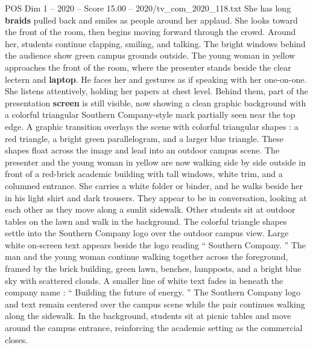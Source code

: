 \begin{textsample}{POS Dim 1 – 2020 – Score 15.00 – 2020/tv\_com\_2020\_118.txt}
She has long \textbf{braids} pulled back and smiles as people around her applaud.
She looks toward the front of the room, then begins moving forward through the crowd.
Around her, students continue clapping, smiling, and talking.
The bright windows behind the audience show green campus grounds outside.
The young woman in yellow approaches the front of the room, where the presenter stands beside the clear lectern and \textbf{laptop}.
He faces her and gestures as if speaking with her one-on-one.
She listens attentively, holding her papers at chest level.
Behind them, part of the presentation \textbf{screen} is still visible, now showing a clean graphic background with a colorful triangular Southern Company-style mark partially seen near the top edge.
A graphic transition overlays the scene with colorful triangular shapes : a red triangle, a bright green parallelogram, and a larger blue triangle.
These shapes float across the image and lead into an outdoor campus scene.
The presenter and the young woman in yellow are now walking side by side outside in front of a red-brick academic building with tall windows, white trim, and a columned entrance.
She carries a white folder or binder, and he walks beside her in his light shirt and dark trousers.
They appear to be in conversation, looking at each other as they move along a sunlit sidewalk.
Other students sit at outdoor tables on the lawn and walk in the background.
The colorful triangle shapes settle into the Southern Company logo over the outdoor campus view.
Large white on-screen text appears beside the logo reading “ Southern Company. ” The man and the young woman continue walking together across the foreground, framed by the brick building, green lawn, benches, lampposts, and a bright blue sky with scattered clouds.
A smaller line of white text fades in beneath the company name : “ Building the future of energy. ” The Southern Company logo and text remain centered over the campus scene while the pair continues walking along the sidewalk.
In the background, students sit at picnic tables and move around the campus entrance, reinforcing the academic setting as the commercial closes.

\end{textsample}
